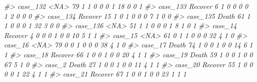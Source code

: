 \documentclass[]{book}
\newenvironment{Shaded}{\begin{snugshade}}{\end{snugshade}}
\newcommand{\CommentTok}[1]{\textcolor[rgb]{0.56,0.35,0.01}{\textit{#1}}}
\begin{document}
\begin{Shaded}
\begin{Highlighting}[]
\CommentTok{#> case_132    <NA>  79        1        1                0                 0                 0              1                    18                      0           0             1}
\CommentTok{#> case_133 Recover   6        1        0                0                 0                 0              1                     2                      0           0             0}
\CommentTok{#> case_134 Recover  15        1        0                1                 0                 0              0                     7                      1           0             0}
\CommentTok{#> case_135   Death  61        1        1                0                 0                 0              1                    32                      3           0             0}
\CommentTok{#> case_136    <NA>  51        1        1                0                 0                 0              1                     8                      1           0             1}
\CommentTok{#> case_14  Recover   4        0        0                0                 1                 0              0                    10                      5           1             1}
\CommentTok{#> case_15     <NA>  61        0        1                1                 0                 0              0                    32                      4           1             0}
\CommentTok{#> case_16     <NA>  79        0        0                1                 0                 0              0                    38                      4           1             0}
\CommentTok{#> case_17    Death  74        1        0                0                 1                 0              0                    14                      6           1             1}
\CommentTok{#> case_18  Recover  66        1        0                0                 1                 0              0                    20                      4           1             1}
\CommentTok{#> case_19    Death  59        1        0                0                 1                 0              0                    67                      5           1             0}
\CommentTok{#> case_2     Death  27        1        0                0                 1                 0              0                    11                      4           1             1}
\CommentTok{#> case_20  Recover  55        1        0                0                 0                 0              1                    22                      4           1             1}
\CommentTok{#> case_21  Recover  67        1        0                0                 1                 0              0                    23                      1           1             1}

\end{Highlighting}
\end{Shaded}
\end{document}
